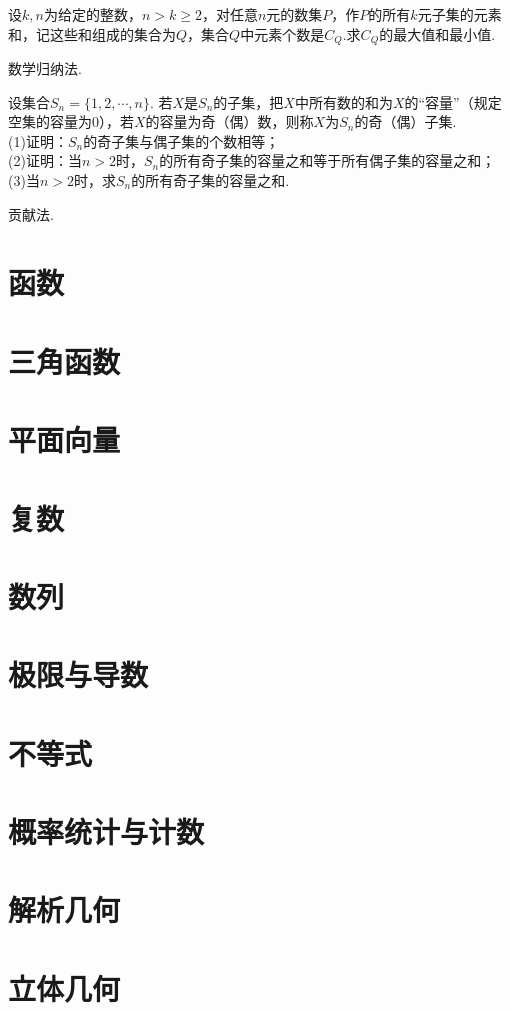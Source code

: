 \documentclass[lang=cn, zihao=4.5]{elegantbook}
\begin{document}
\begin{example} %
	设$k,n$为给定的整数，$n>k \geq 2$，对任意$n$元的数集$P$，作$P$的所有$k$元子集的元素和，记这些和组成的集合为$Q$，集合$Q$中元素个数是$C_Q$.求$C_Q$的最大值和最小值.
\end{example}
\begin{hint}
	数学归纳法.
\end{hint}

\begin{example} %
	设集合$S_n=\{1,2, \cdots ,n\}$. 若$X$是$S_n$的子集，把$X$中所有数的和为$X$的“容量”（规定空集的容量为$0$），若$X$的容量为奇（偶）数，则称$X$为$S_n$的奇（偶）子集. \\
    (1)证明：$S_n$的奇子集与偶子集的个数相等；\\
    (2)证明：当$n>2$时，$S_n$的所有奇子集的容量之和等于所有偶子集的容量之和；\\
    (3)当$n>2$时，求$S_n$的所有奇子集的容量之和.
\end{example}
\begin{hint}
	贡献法.
\end{hint}
 
\chapter{函数}

\chapter{三角函数}

\chapter{平面向量}

\chapter{复数}

\chapter{数列}

\chapter{极限与导数}

\chapter{不等式}

\chapter{概率统计与计数}

\chapter{解析几何}

\chapter{立体几何}
\end{document}
